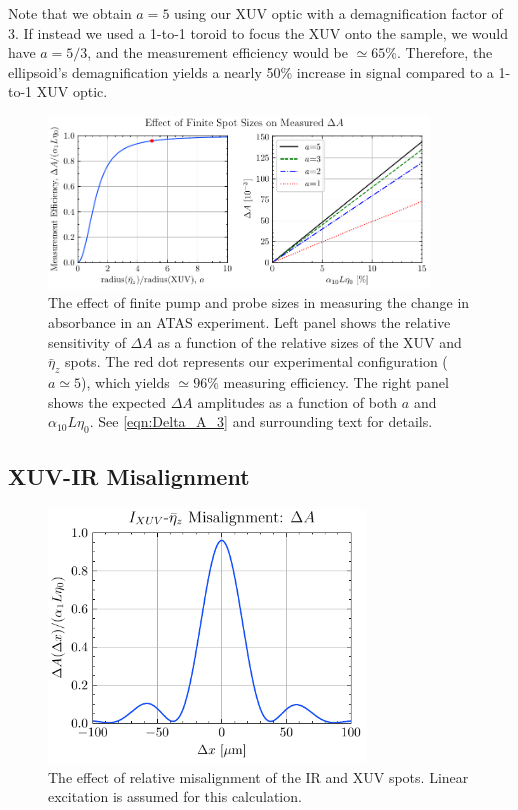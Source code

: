 Note that we obtain $a=5$ using our XUV optic with a demagnification factor of 3. If instead we used a 1-to-1 toroid to focus the XUV onto the sample, we would have $a=5/3$, and the measurement efficiency would be $\simeq 65\%$. Therefore, the ellipsoid's demagnification yields a nearly 50\% increase in signal compared to a 1-to-1 XUV optic.

\begin{figure}
	\centering
	\includegraphics[width=0.9\textwidth]{figures/chap4/Delta_A_curves.pdf}
	\caption{The effect of finite pump and probe sizes in measuring the change in absorbance in an ATAS experiment. Left panel shows the relative sensitivity of $\Delta A$ as a function of the relative sizes of the XUV and $\bar{\eta}_z$ spots. The red dot represents our experimental configuration ($a\simeq 5$), which yields $\simeq 96\%$ measuring efficiency. The right panel shows the expected $\Delta A$ amplitudes as a function of both $a$ and $\alpha_{10} L \eta_0$. See \cref{eqn:Delta_A_3} and surrounding text for details.}
	\label{fig:Delta_A_curve}
\end{figure}


\subsection{XUV-IR Misalignment}

\begin{figure}
	\centering
	\includegraphics[width=0.75\textwidth]{figures/chap4/XUV_eta_misalignment.pdf}
	\caption{The effect of relative misalignment of the IR and XUV spots. Linear excitation is assumed for this calculation.}
	\label{fig:XUV_eta_misalignment}
\end{figure}

